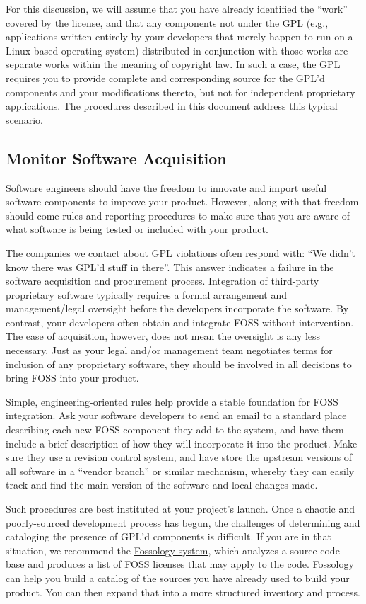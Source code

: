 \documentclass[letterpaper]{fixme}
\begin{document}
For this discussion, we will assume that you have already identified the
``work'' covered by the license, and that any components not under the GPL
(e.g., applications written entirely by your developers that merely happen
to run on a Linux-based operating system) distributed in conjunction with
those works are separate works within the meaning of copyright law.  In
such a case, the GPL requires you to provide complete and corresponding
source for the GPL'd components and your modifications thereto, but not
for independent proprietary applications.  The procedures described in
this document address this typical scenario.

\subsection{Monitor Software Acquisition}

Software engineers should have the freedom to innovate and import useful
software components to improve your product.  However, along with that
freedom should come rules and reporting procedures to make sure that you
are aware of what software is being tested or included with your product.

The companies we contact about GPL violations often respond with: ``We
didn't know there was GPL'd stuff in there''.  This answer indicates a
failure in the software acquisition and procurement process.  Integration
of third-party proprietary software typically requires a formal
arrangement and management/legal oversight before the developers
incorporate the software.  By contrast, your developers often obtain and
integrate FOSS without intervention. The ease of acquisition, however,
does not mean the oversight is any less necessary.  Just as your legal
and/or management team negotiates terms for inclusion of any proprietary
software, they should be involved in all decisions to bring FOSS into your
product.

Simple, engineering-oriented rules help provide a stable foundation for
FOSS integration.  Ask your software developers to send an email to a
standard place describing each new FOSS component they add to the system,
and have them include a brief description of how they will incorporate it
into the product.  Make sure they use a revision control system, and have
store the upstream versions of all software in a ``vendor branch'' or
similar mechanism, whereby they can easily track and find the main version
of the software and local changes made.

Such procedures are best instituted at your project's launch.  Once a
chaotic and poorly-sourced development process has begun, the challenges
of determining and cataloging the presence of GPL'd components is
difficult.  If you are in that situation, we recommend the
\href{http://fossology.org/}{Fossology system}, which analyzes a
source-code base and produces a list of FOSS licenses that may apply to
the code.  Fossology can help you build a catalog of the sources you have
already used to build your product.  You can then expand that into a more
structured inventory and process.
\end{document}
